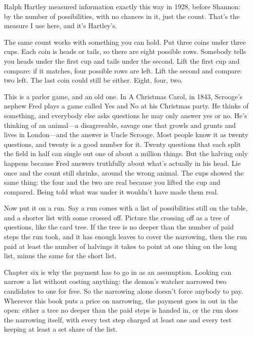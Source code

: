 \documentclass[11pt,twoside]{article}
\theoremstyle{thielethm}
\theoremstyle{thieledef}
\theoremstyle{thieledef}
\theoremstyle{thieledef}
\theoremstyle{thielethm}
\theoremstyle{thieleobs}
\theoremstyle{thielethm}
\begin{document}
Ralph Hartley measured information exactly this way in 1928, before Shannon: by the number of possibilities, with no chances in it, just the count. That's the measure I use here, and it's Hartley's.

The same count works with something you can hold. Put three coins under three cups. Each coin is heads or tails, so there are eight possible rows. Somebody tells you heads under the first cup and tails under the second. Lift the first cup and compare: if it matches, four possible rows are left. Lift the second and compare: two left. The last coin could still be either. Eight, four, two.

This is a parlor game, and an old one. In A Christmas Carol, in 1843, Scrooge's nephew Fred plays a game called Yes and No at his Christmas party. He thinks of something, and everybody else asks questions he may only answer yes or no. He's thinking of an animal---a disagreeable, savage one that growls and grunts and lives in London---and the answer is Uncle Scrooge. Most people know it as twenty questions, and twenty is a good number for it. Twenty questions that each split the field in half can single out one of about a million things. But the halving only happens because Fred answers truthfully about what's actually in his head. Lie once and the count still shrinks, around the wrong animal. The cups showed the same thing: the four and the two are real because you lifted the cup and compared. Being told what was under it wouldn't have made them real.

Now put it on a run. Say a run comes with a list of possibilities still on the table, and a shorter list with some crossed off. Picture the crossing off as a tree of questions, like the card tree. If the tree is no deeper than the number of paid steps the run took, and it has enough leaves to cover the narrowing, then the run paid at least the number of halvings it takes to point at one thing on the long list, minus the same for the short list.

Chapter six is why the payment has to go in as an assumption. Looking can narrow a list without costing anything: the demon's watcher narrowed two candidates to one for free. So the narrowing alone doesn't force anybody to pay. Wherever this book puts a price on narrowing, the payment goes in out in the open: either a tree no deeper than the paid steps is handed in, or the run does the narrowing itself, with every test step charged at least one and every test keeping at least a set share of the list.
\end{document}
